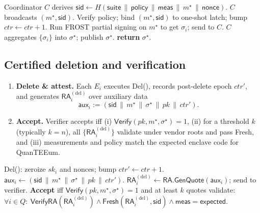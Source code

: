 \documentclass[runningheads,orivec]{llncs}
\newcommand{\prot}{\textsf{QuanTEEum}}
\newcommand{\RA}{\mathsf{RA}}
\newcommand{\FROST}{\textsf{FROST}}
\begin{document}
\begin{algorithm}[!htbp]
\caption{\prot{}: \emph{SingleSign} on designated message $m^{\star}$}
\label{alg:sign}
\begin{small}
\begin{algorithmic}[1]
\State Coordinator $C$ derives $\mathsf{sid} \gets H(\mathsf{suite}\,\|\,\mathsf{policy}\,\|\,\mathsf{meas}\,\|\,m^{\star}\,\|\,\mathsf{nonce})$.
\State $C$ broadcasts $(m^{\star},\mathsf{sid})$.
  \State Verify policy; bind $(m^{\star},\mathsf{sid})$ to one\mbox{-}shot latch; bump $ctr \leftarrow ctr{+}1$.
  \State Run \FROST{} partial signing on $m^{\star}$ to get $\sigma_i$; send to $C$.
\EndFor
\State $C$ aggregates $\{\sigma_i\}$ into $\sigma^{\star}$; publish $\sigma^{\star}$.
\State \textbf{return} $\sigma^{\star}$.
\end{algorithmic}
\end{small}
\end{algorithm}

\subsection{Certified deletion and verification}\label{sec:verify}
\begin{enumerate}
  \item \textbf{Delete \& attest.} Each $E_i$ executes \textsf{Del}(), records post-delete epoch $ctr'$, and generates $\RA_i^{(\mathrm{del})}$ over auxiliary data
  \[
    \textsf{aux}_i := (\mathsf{sid}\,\|\,m^{\star}\,\|\,\sigma^{\star}\,\|\,pk\,\|\,ctr').
  \]
  \item \textbf{Accept.} Verifier accepts iff (i) $\mathsf{Verify}(pk,m^{\star},\sigma^{\star})=1$, (ii) for a threshold $k$ (typically $k{=}n$), all $\{\RA_i^{(\mathrm{del})}\}$ validate under vendor roots and pass \textsf{Fresh}, and (iii) measurements and policy match the expected enclave code for \prot{}.
\end{enumerate}

\begin{algorithm}[!htbp]
\caption{\prot{}: \emph{DeleteAndVerify}}
\label{alg:delete-verify}
\begin{small}
\begin{algorithmic}[1]
  \State \textsf{Del}(): zeroize $sk_i$ and nonces; bump $ctr' \leftarrow ctr{+}1$.
  \State $\textsf{aux}_i \gets (\mathsf{sid}\,\|\,m^{\star}\,\|\,\sigma^{\star}\,\|\,pk\,\|\,ctr')$.
  \State $\RA_i^{(\mathrm{del})} \gets \textsf{RA.GenQuote}(\textsf{aux}_i)$; send to verifier.
\EndFor
\State \textbf{Accept} iff $\mathsf{Verify}(pk,m^{\star},\sigma^{\star})=1$ and at least $k$ quotes validate:
\State \hspace{1.2em}$\forall i\in Q:\ \textsf{VerifyRA}(\RA_i^{(\mathrm{del})})\wedge \textsf{Fresh}(\RA_i^{(\mathrm{del})},\mathsf{sid})\wedge \mathsf{meas}{=}\mathsf{expected}$.
\end{algorithmic}
\end{small}
\end{algorithm}
\end{document}
